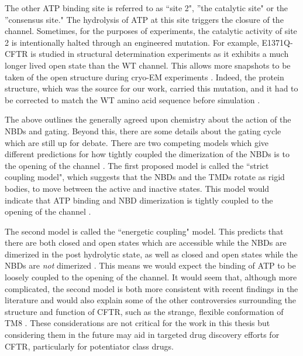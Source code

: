 The other ATP binding site is referred to as ``site 2", ''the catalytic site" or the ''consensus site." The hydrolysis of ATP at this site triggers the closure of the channel. Sometimes, for the purposes of experiments, the catalytic activity of site 2 is intentionally halted through an engineered mutation. For example, E1371Q-CFTR is studied in structural determination experiments as it exhibits a much longer lived open state than the WT channel. This allows more snapshots to be taken of the open structure during cryo-EM experiments \cite{ramjeesingh1999, gout2012, muallem2009, hwang2013}. Indeed, the protein structure, which was the source for our work, carried this mutation, and it had to be corrected to match the WT amino acid sequence before simulation \cite{zhang2018}. 

The above outlines the generally agreed upon chemistry about the action of the NBDs and gating. Beyond this, there are some details about the gating cycle which are still up for debate. There are two competing models which give different predictions for how tightly coupled the dimerization of the NBDs is to the opening of the channel \cite{yeh2022}. The first proposed model is called the ``strict coupling model", which suggests that the NBDs and the TMDs rotate as rigid bodies, to move between the active and inactive states. This model would indicate that ATP binding and NBD dimerization is tightly coupled to the opening of the channel \cite{jih2012}. 

The second model is called the ``energetic coupling" model. This predicts that there are both closed and open states which are accessible while the NBDs are dimerized in the post hydrolytic state, as well as closed and open states while the NBDs are \textit{not} dimerized \cite{jih2012}. This means we would expect the binding of ATP to be loosely coupled to the opening of the channel. It would seem that, although more complicated, the second model is both more consistent with recent findings in the literature and would also explain some of the other controversies surrounding the structure and function of CFTR, such as the strange, flexible conformation of TM8 \cite{fay2018}. These considerations are not critical for the work in this thesis but considering them in the future may aid in targeted drug discovery efforts for CFTR, particularly for potentiator class drugs.


